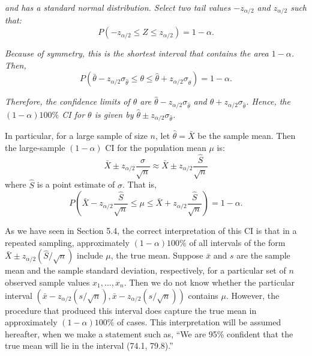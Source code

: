 \textit{and has a standard normal distribution. Select two tail values $-z_{\alpha/2}$ and $z_{\alpha/2}$ such that:}
\[
P(-z_{\alpha/2} \leq Z \leq z_{\alpha/2}) = 1 - \alpha.
\]

\textit{Because of symmetry, this is the shortest interval that contains the area $1 - \alpha$. Then,}
\[
P\left(\bar{\theta} - z_{\alpha/2}\sigma_{\hat{\theta}} \leq \theta \leq \hat{\theta} + z_{\alpha/2}\sigma_{\hat{\theta}}\right) = 1 - \alpha.
\]

\textit{Therefore, the confidence limits of $\theta$ are $\hat{\theta} - z_{\alpha/2}\sigma_{\hat{\theta}}$ and $\hat{\theta} + z_{\alpha/2}\sigma_{\hat{\theta}}$. Hence, the $(1-\alpha)100\%$ CI for $\theta$ is given by $\hat{\theta} \pm z_{\alpha/2}\sigma_{\hat{\theta}}$.}

In particular, for a large sample of size $n$, let $\hat{\theta} = \bar{X}$ be the sample mean. Then the large-sample $(1-\alpha)$ CI for the population mean $\mu$ is:
\[
\bar{X} \pm z_{\alpha/2}\frac{\sigma}{\sqrt{n}} \approx \bar{X} \pm z_{\alpha/2}\frac{\hat{S}}{\sqrt{n}}
\]
where $\hat{S}$ is a point estimate of $\sigma$. That is,
\[
P\left(\bar{X} - z_{\alpha/2}\frac{\hat{S}}{\sqrt{n}} \leq \mu \leq \bar{X} + z_{\alpha/2}\frac{\hat{S}}{\sqrt{n}}\right) = 1 - \alpha.
\]

As we have seen in Section 5.4, the correct interpretation of this CI is that in a repeated sampling, approximately $(1-\alpha)100\%$ of all intervals of the form $\bar{X} \pm z_{\alpha/2}(\hat{S}/\sqrt{n})$ include $\mu$, the true mean. Suppose $\bar{x}$ and $s$ are the sample mean and the sample standard deviation, respectively, for a particular set of $n$ observed sample values $x_1, \ldots, x_n$. Then we do not know whether the particular interval $(\bar{x} - z_{\alpha/2}(s/\sqrt{n}), \bar{x} - z_{\alpha/2}(s/\sqrt{n}))$ contains $\mu$. However, the procedure that produced this interval does capture the true mean in approximately $(1-\alpha)100\%$ of cases. This interpretation will be assumed hereafter, when we make a statement such as, ``We are 95\% confident that the true mean will lie in the interval (74.1, 79.8).''

